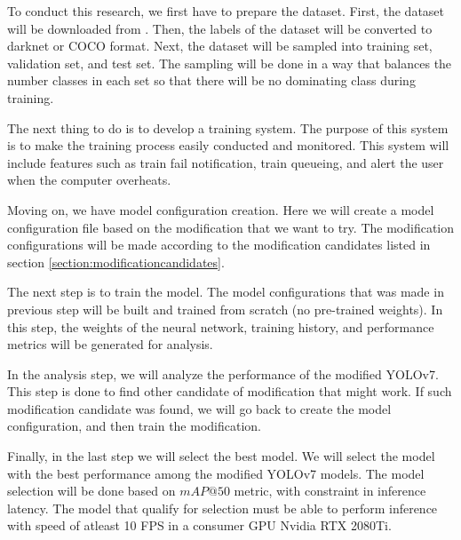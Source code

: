 
To conduct this research, we first have to prepare the dataset.
First, the dataset will be downloaded from \textcite{aot_dataset}.
Then, the labels of the dataset will be converted to darknet or COCO format.
Next, the dataset will be sampled into training set, validation set, and test set.
The sampling will be done in a way that balances the number classes in each set so
that there will be no dominating class during training.
  
The next thing to do is to develop a training system.
The purpose of this system is to make the training process easily conducted and monitored.
This system will include features such as train fail notification, train queueing, and alert the user
when the computer overheats.

Moving on, we have model configuration creation. Here we will create a model configuration file based on the 
modification that we want to try. The modification configurations will be made according to the modification
candidates listed in section \ref{section:modificationcandidates}.

The next step is to train the model.
The model configurations that was made in previous step will be built and trained from scratch (no pre-trained weights).
In this step, the weights of the neural network, training history, and performance metrics will be generated for analysis.

In the analysis step, we will analyze the performance of the modified YOLOv7.
This step is done to find other candidate of modification that might work.
If such modification candidate was found, we will go back to create the model configuration, 
and then train the modification.

Finally, in the last step we will select the best model.
We will select the model with the best performance among the modified YOLOv7 models.
The model selection will be done based on $mAP@50$ metric, with constraint in inference latency.
The model that qualify for selection must be able to perform inference with speed of atleast 10 FPS in a consumer GPU Nvidia RTX 2080Ti.


